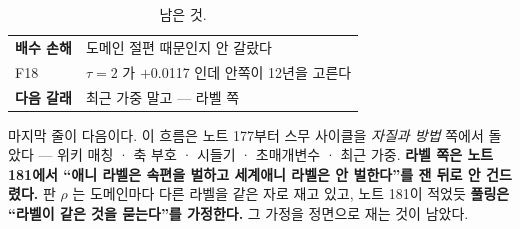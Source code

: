 \documentclass[10pt]{article}
\begin{document}


\begin{table}[t]
\centering\tsize
\caption{남은 것.}
\begin{tabular}{ll}
\toprule
\textbf{배수 손해} & 도메인 절편 때문인지 안 갈랐다 \\
F18 & $\tau{=}2$ 가 $+$0.0117 인데 안쪽이 12년을 고른다 \\
\textbf{다음 갈래} & 최근 가중 말고 --- 라벨 쪽 \\
\bottomrule
\end{tabular}
\end{table}

마지막 줄이 다음이다. 이 흐름은 노트 177부터 스무 사이클을 \emph{자질과
방법} 쪽에서 돌았다 --- 위키 매칭 · 축 부호 · 시들기 · 초매개변수 · 최근
가중. \textbf{라벨 쪽은 노트 181에서 ``애니 라벨은 속편을 벌하고 세계애니
라벨은 안 벌한다''를 잰 뒤로 안 건드렸다.} 판 $\rho$ 는 도메인마다 다른
라벨을 같은 자로 재고 있고, 노트 181이 적었듯 \textbf{풀링은 ``라벨이 같은
것을 묻는다''를 가정한다.} 그 가정을 정면으로 재는 것이 남았다.
\end{document}
